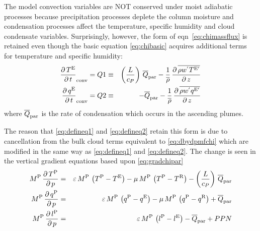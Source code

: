 \documentclass{UMDP_article}
\newcommand{\lsubsup}[2]{\ensuremath{l_{\rm{#1}}^{\rm{#2}}}}
\newcommand{\qsubsup}[2]{\ensuremath{q_{\rm{#1}}^{\rm{#2}}}}
\newcommand{\tsubsup}[2]{\ensuremath{T_{\rm{#1}}^{\rm{#2}}}}
\newcommand{\ov}{\overline}
\newcommand{\lp}{\left(}
\newcommand{\rp}{\right)}
\newcommand{\pardbyd}[2]{\ensuremath{\frac{\partial \, #1}{\partial \, #2}}}
\begin{document}
The model convection variables are NOT conserved under moist adiabatic processes
because precipitation processes deplete the column moisture and condensation
processes affect the temperature, specific humidity and cloud condensate
variables. Surprisingly, however, the form of eqn~\ref{eq:chimassflux} is
retained even though the basic equation \ref{eq:chibasic} acquires additional
terms for temperature and specific humidity:
%
\begin{eqnarray}
{\pardbyd{\tsubsup{ }{E}}{t}}_{\rm{conv}} = Q1 & \equiv &
\lp { \frac{L}{c_{P}} } \rp \, {\ov{Q}}_{\rm{par}}
- \frac{1}{\ov{\rho}} \, \pardbyd{\ov{\rho w^{'} \tsubsup{ }{E'}}}{z} 
\label{eq:defineq1} \\ 
{\pardbyd{\qsubsup{ }{E}}{t}}_{\rm{conv}} = Q2 & \equiv & - {\ov{Q}}_{\rm{par}}
- \frac{1}{\ov{\rho}} \, \pardbyd{\ov{\rho w^{'} \qsubsup{ }{E'}}}{z} 
\label{eq:defineq2} 
\end{eqnarray}
%
where ${\ov{Q}}_{\rm{par}}$ is the rate of condensation which occurs in the
ascending plumes.

The reason that \ref{eq:defineq1} and \ref{eq:defineq2} retain this form
is due to cancellation from the bulk cloud terms equivalent to
\ref{eq:dbydpmfchi} which are modified in the same way as
\ref{eq:defineq1} and \ref{eq:defineq2}. The change is seen in the
vertical gradient equations based upon \ref{eq:gradchipar}
%
\begin{eqnarray}
M^{\rm{P}} \, \pardbyd{\tsubsup{ }{P}}{p} & = & 
\varepsilon \, M^{\rm{P}} \, \lp { \tsubsup{ }{P} - \tsubsup{ }{E} } \rp - 
\mu         \, M^{\rm{P}} \, \lp { \tsubsup{ }{P} - \tsubsup{ }{R} } \rp -
\lp { \frac{L}{c_{P}} } \rp \, {\ov{Q}}_{\rm{par}}  \label{eq:gradtpar} \\
M^{\rm{P}} \, \pardbyd{\qsubsup{ }{P}}{p} & = & 
\varepsilon \, M^{\rm{P}} \, \lp { \qsubsup{ }{P} - \qsubsup{ }{E} } \rp - 
\mu         \, M^{\rm{P}} \, \lp { \qsubsup{ }{P} - \qsubsup{ }{R} } \rp +
{\ov{Q}}_{\rm{par}}  \label{eq:gradqpar}  \\
M^{\rm{P}} \, \pardbyd{\lsubsup{ }{P}}{p} & = & 
\varepsilon \, M^{\rm{P}} \, \lp { \lsubsup{ }{P} - \lsubsup{ }{E} } \rp
- {\ov{Q}}_{\rm{par}} + PPN  \label{eq:gradlpar} 
\end{eqnarray}
\end{document}
